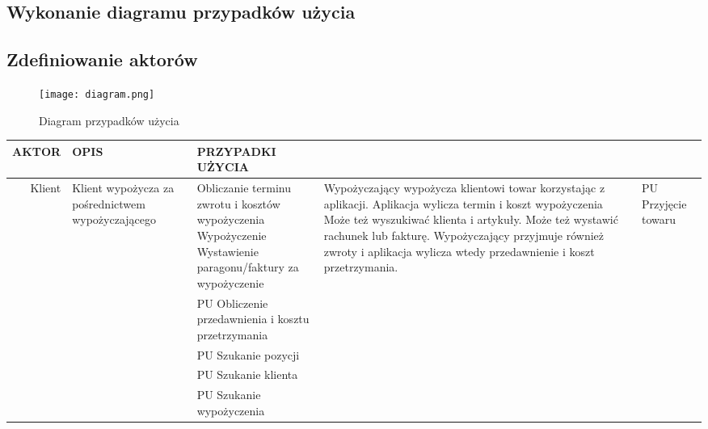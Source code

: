 \documentclass{article}
\begin{document}
	\subsection{Wykonanie diagramu przypadków użycia}
	\newpage
	\subsection{Zdefiniowanie aktorów}
\begin{figure}
	\centering
	\texttt{[image: diagram.png]}
	\caption{Diagram przypadków użycia}
	\label{fig:obrazek 1}
\end{figure}
\begin{tabular}{| r | p{5cm} | l |} \hline 
	AKTOR & OPIS & PRZYPADKI UŻYCIA   \\ \hline
	\multirow{3}{*}{Klient} & Klient wypożycza za pośrednictwem wypożyczającego & 
	\makecell{Obliczanie terminu zwrotu i kosztów wypożyczenia \\ 
	Wypożyczenie \\ 
	Wystawienie paragonu/faktury za wypożyczenie \\ }
	\hline
	\multirow{5}{*}{Wypożyczający} & Wypożyczający wypożycza klientowi towar korzystając z aplikacji.  Aplikacja wylicza termin i koszt wypożyczenia Może też wyszukiwać klienta i artykuły. Może też wystawić rachunek lub fakturę. Wypożyczający przyjmuje również zwroty i aplikacja wylicza wtedy przedawnienie i koszt przetrzymania. & PU Przyjęcie towaru\\
	&&PU Obliczenie przedawnienia i kosztu przetrzymania\\
	&&PU Szukanie pozycji\\ 
	&&PU Szukanie klienta\\ 
	&&PU Szukanie wypożyczenia \\ \hline
\end{tabular}
	\newpage
\end{document}

